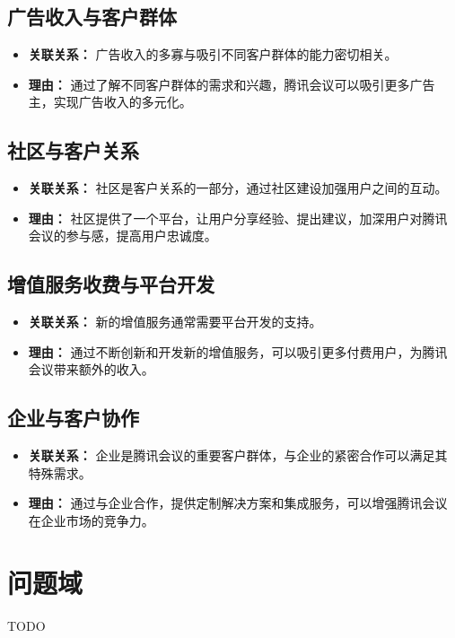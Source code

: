 \documentclass[a4paper,12pt]{article}
\begin{document}
\subsection{广告收入与客户群体}
\begin{itemize}
\item\textbf{关联关系：} 广告收入的多寡与吸引不同客户群体的能力密切相关。 
\item\textbf{理由：} 通过了解不同客户群体的需求和兴趣，腾讯会议可以吸引更多广告主，实现广告收入的多元化。
\end{itemize}
\subsection{社区与客户关系}
\begin{itemize}
\item\textbf{关联关系：} 社区是客户关系的一部分，通过社区建设加强用户之间的互动。 
\item\textbf{理由：} 社区提供了一个平台，让用户分享经验、提出建议，加深用户对腾讯会议的参与感，提高用户忠诚度。
\end{itemize}
\subsection{增值服务收费与平台开发}
\begin{itemize}
\item\textbf{关联关系：} 新的增值服务通常需要平台开发的支持。 
\item\textbf{理由：} 通过不断创新和开发新的增值服务，可以吸引更多付费用户，为腾讯会议带来额外的收入。
\end{itemize}
\subsection{企业与客户协作}
\begin{itemize}
\item\textbf{关联关系：} 企业是腾讯会议的重要客户群体，与企业的紧密合作可以满足其特殊需求。 
\item\textbf{理由：} 通过与企业合作，提供定制解决方案和集成服务，可以增强腾讯会议在企业市场的竞争力。
\end{itemize}

\section{问题域}
TODO
\end{document}
